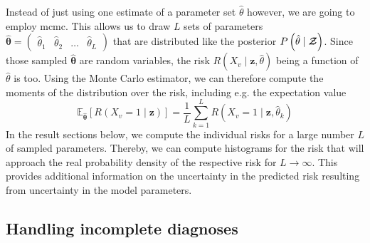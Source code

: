 \documentclass[\relativeRoot/main.tex]{subfiles}
\begin{document}
Instead of just using one estimate of a parameter set $\hat{\theta}$ however, we are going to employ \gls{mcmc}. This allows us to draw $L$ sets of parameters $\boldsymbol{\hat{\theta}} = \begin{pmatrix} \hat{\theta}_1 & \hat{\theta}_2 & \ldots & \hat{\theta}_L \end{pmatrix}$ that are distributed like the posterior $P \left( \hat{\theta} \mid \boldsymbol{\mathcal{Z}} \right)$. Since those sampled $\boldsymbol{\hat{\theta}}$ are random variables, the risk $R \left( X_v \mid \mathbf{z}, \hat{\theta} \right)$ being a function of $\hat{\theta}$ is too. Using the Monte Carlo estimator, we can therefore compute the moments of the distribution over the risk, including e.g. the expectation value
%
\begin{equation}
    \mathbb{E}_{\boldsymbol{\hat{\theta}}} \left[ R \left( X_v = 1 \mid \mathbf{z} \right) \right] = \frac{1}{L} \sum_{k=1}^{L}{R \left( X_v = 1 \mid \mathbf{z}, \hat{\theta}_k \right)}
\end{equation}
%
In the result sections below, we compute the individual risks for a large number $L$ of sampled parameters. Thereby, we can compute histograms for the risk that will approach the real probability density of the respective risk for $L \rightarrow \infty$. This provides additional information on the uncertainty in the predicted risk resulting from uncertainty in the model parameters.

\subsection{Handling incomplete diagnoses}
\label{subsec:unilateral:formalism:incomplete_diagnose}
\end{document}
